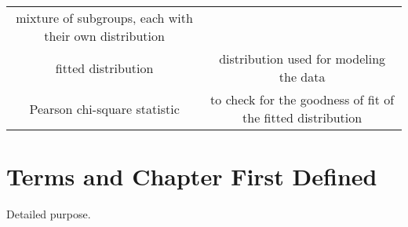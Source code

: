 \documentclass[]{book}
\theoremstyle{definition}
\theoremstyle{definition}
\theoremstyle{definition}
\theoremstyle{remark}
\begin{document}
\begin{longtable}[]{@{}cc@{}}
\begin{minipage}[t]{0.43\columnwidth}
mixture of subgroups, each with their own distribution\strut
\end{minipage}\tabularnewline
\begin{minipage}[t]{0.43\columnwidth}\centering\strut
fitted distribution\strut
\end{minipage} & \begin{minipage}[t]{0.43\columnwidth}\centering\strut
distribution used for modeling the data\strut
\end{minipage}\tabularnewline
\begin{minipage}[t]{0.43\columnwidth}\centering\strut
Pearson chi-square statistic\strut
\end{minipage} & \begin{minipage}[t]{0.43\columnwidth}\centering\strut
to check for the goodness of fit of the fitted distribution\strut
\end{minipage}\tabularnewline
\bottomrule
\end{longtable}

\section{Terms and Chapter First
Defined}\label{terms-and-chapter-first-defined}

Detailed purpose.
\end{document}
